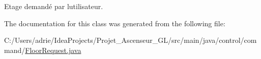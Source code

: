 Etage demandé par l\textquotesingle{}utilisateur. 



The documentation for this class was generated from the following file\+:\begin{DoxyCompactItemize}
\item 
C\+:/\+Users/adrie/\+Idea\+Projects/\+Projet\+\_\+\+Ascenseur\+\_\+\+G\+L/src/main/java/control/command/\mbox{\hyperlink{_floor_request_8java}{Floor\+Request.\+java}}\end{DoxyCompactItemize}
